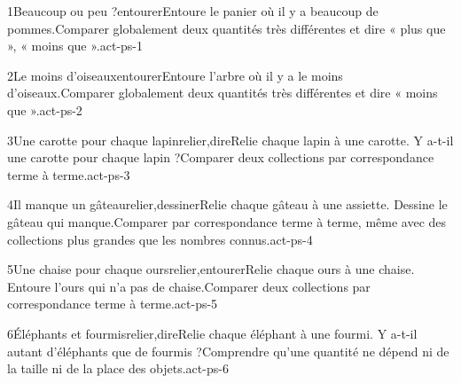 \begin{activite}{1}{Beaucoup ou peu ?}{entourer}{Entoure le panier où il y a {\otBold\color{otNavy}beaucoup} de pommes.}{Comparer globalement deux quantités très différentes et dire « plus que », « moins que ».}{act-ps-1}
\end{activite}
\begin{activite}{2}{Le moins d’oiseaux}{entourer}{Entoure l’arbre où il y a le {\otBold\color{otNavy}moins} d’oiseaux.}{Comparer globalement deux quantités très différentes et dire « moins que ».}{act-ps-2}
\end{activite}
\begin{activite}{3}{Une carotte pour chaque lapin}{relier,dire}{Relie chaque lapin à une carotte. Y a-t-il une carotte pour chaque lapin ?}{Comparer deux collections par correspondance terme à terme.}{act-ps-3}
\end{activite}
\begin{activite}{4}{Il manque un gâteau}{relier,dessiner}{Relie chaque gâteau à une assiette. Dessine le gâteau qui manque.}{Comparer par correspondance terme à terme, même avec des collections plus grandes que les nombres connus.}{act-ps-4}
\end{activite}
\begin{activite}{5}{Une chaise pour chaque ours}{relier,entourer}{Relie chaque ours à une chaise. Entoure l’ours qui n’a pas de chaise.}{Comparer deux collections par correspondance terme à terme.}{act-ps-5}
\end{activite}
\begin{activite}{6}{Éléphants et fourmis}{relier,dire}{Relie chaque éléphant à une fourmi. Y a-t-il autant d’éléphants que de fourmis ?}{Comprendre qu’une quantité ne dépend ni de la taille ni de la place des objets.}{act-ps-6}
\end{activite}
